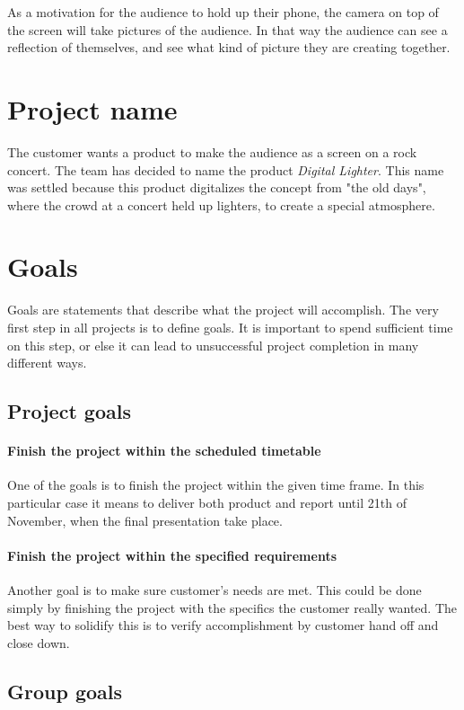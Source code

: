 As a motivation for the audience to hold up their phone, the camera on top of the screen will take pictures of the audience.
In that way the audience can see a reflection of themselves, and see what kind of picture they are creating together.

\section{Project name}
The customer wants a product to make the audience as a screen on a rock concert. 
The team has decided to name the product \emph{Digital Lighter}. 
This name was settled because this product digitalizes the concept from "the old days", where the crowd at a concert held up lighters, to create a special atmosphere. 

\section{Goals}
Goals are statements that describe what the project will accomplish. 
The very first step in all projects is to define goals. 
It is important to spend sufficient time on this step, or else it can lead to unsuccessful project completion in many different ways. 
   
\label{sec:project-goals}

\subsection{Project goals}

\paragraph{Finish the project within the scheduled timetable}
One of the goals is to finish the project within the given time frame. 
In this particular case it means to deliver both product and report until 21th of November, when the final presentation take place.

\paragraph{Finish the project within the specified requirements}
Another goal is to make sure customer's needs are met.
This could be done simply by finishing the project with the specifics the customer really wanted. 
The best way to solidify this is to verify accomplishment by customer hand off and close down.

\subsection{Group goals}
